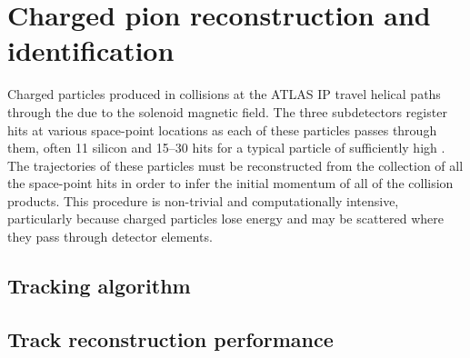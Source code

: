 \chapter{Charged pion reconstruction and identification}
\label{ch:reconstruction}
\graphicspath{{Chapter-Reconstruction/figures/}}

Charged particles produced in collisions at the ATLAS \ac{IP} travel helical paths through the \id due to the solenoid magnetic field.
The three subdetectors register hits at various space-point locations as each of these particles passes through them, often 11 silicon and 15--30 \trt hits for a typical particle of sufficiently high \pt.
The trajectories of these particles must be reconstructed from the collection of all the space-point hits in order to infer the initial momentum of all of the collision products.
This procedure is non-trivial and computationally intensive, particularly because charged particles lose energy and may be scattered where they pass through detector elements.

\section{Tracking algorithm}



\cite{Aad:2010bx} %
\cite{Cornelissen:2007vba} %
\cite{Cornelissen:2008zza} %

\section{Track reconstruction performance}

